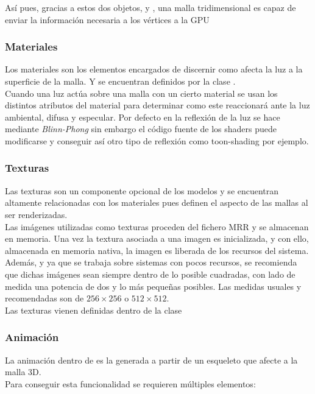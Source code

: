 Así pues, gracias a estos dos objetos, \rorefbuffer y \rorefbufferkey, una malla tridimensional es capaz de enviar la información necesaria a los vértices a la GPU

\subsubsection{Materiales}
Los materiales son los elementos encargados de discernir como afecta la luz a la superficie de la malla. Y se encuentran definidos por la clase \rorefmaterial.\\

Cuando una luz actúa sobre una malla con un cierto material se usan los distintos atributos del material para determinar como este reaccionará ante la luz ambiental, difusa y especular. Por defecto en \robotto la reflexión de la luz se hace mediante \textit{Blinn-Phong} sin embargo el código fuente de los shaders puede modificarse y conseguir así otro tipo de reflexión como toon-shading por ejemplo.
 

\subsubsection{Texturas}
Las texturas son un componente opcional de los modelos y se encuentran altamente relacionadas con los materiales pues definen el aspecto de las mallas al ser renderizadas.\\
Las imágenes utilizadas como texturas proceden del fichero MRR y se almacenan en memoria. Una vez la textura asociada a una imagen es inicializada, y con ello, almacenada en memoria nativa, la imagen es liberada de los recursos del sistema.\\
Además, y ya que se trabaja sobre sistemas con pocos recursos, se recomienda que dichas imágenes sean siempre dentro de lo posible cuadradas, con lado de medida una potencia de dos y lo más pequeñas posibles. Las medidas usuales y recomendadas son de $256\times 256$ o $512\times 512$.\\

Las texturas vienen definidas dentro de la clase \roreftexture

\subsubsection{Animación}
La animación dentro de \robotto es la generada a partir de un esqueleto que afecte a la malla 3D.\\
Para conseguir esta funcionalidad se requieren múltiples elementos:\\

